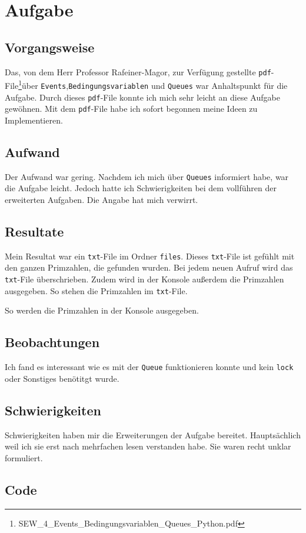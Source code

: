 
\section{Aufgabe}
\subsection{Vorgangsweise}
Das, von dem Herr Professor Rafeiner-Magor, zur Verfügung gestellte \verb|pdf|-File\footnote{SEW\_4\_Events\_Bedingungsvariablen\_Queues\_Python.pdf}\space über \verb|Events|,\space\verb|Bedingungsvariablen| und \verb|Queues| war Anhaltspunkt für die Aufgabe. Durch dieses \verb|pdf|-File konnte ich mich sehr leicht an diese Aufgabe gewöhnen. Mit dem \verb|pdf|-File habe ich sofort begonnen meine Ideen zu Implementieren.
\subsection{Aufwand}
Der Aufwand war gering. Nachdem ich mich über \verb|Queues| informiert habe, war die Aufgabe leicht. Jedoch hatte ich Schwierigkeiten bei dem vollführen der erweiterten Aufgaben. Die Angabe hat mich verwirrt.
\subsection{Resultate}
Mein Resultat war ein \verb|txt|-File im Ordner \verb|files|. Dieses \verb|txt|-File ist gefühlt mit den ganzen Primzahlen, die gefunden wurden. Bei jedem neuen Aufruf wird das \verb|txt|-File überschrieben. Zudem wird in der Konsole außerdem die Primzahlen ausgegeben.
So stehen die Primzahlen im \verb|txt|-File.

So werden die Primzahlen in der Konsole ausgegeben.

\subsection{Beobachtungen}
Ich fand es interessant wie es mit der \verb|Queue| funktionieren konnte und kein \verb|lock| oder Sonstiges benötitgt wurde.
\subsection{Schwierigkeiten}
Schwierigkeiten haben mir die Erweiterungen der Aufgabe bereitet. Hauptsächlich weil ich sie erst nach mehrfachen lesen verstanden habe. Sie waren recht unklar formuliert.
\subsection{Code}
\clearpage
\clearpage
